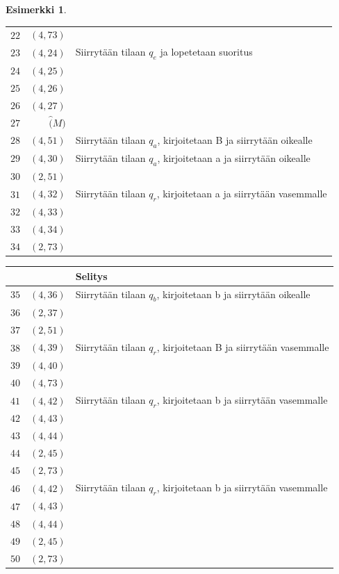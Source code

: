 \documentclass[a4paper, 12pt]{article}
\theoremstyle{definition}
\newtheorem{example}[mydef]{Esimerkki}
\theoremstyle{plain}
\begin{document}
\begin{example}
\begin{tabular}[t]{r|r|l}
$\hat{22}$ & $(4, 73)$  &\\
$\hat{23}$ & $(4, 24)$  & Siirrytään tilaan $q_e$ ja lopetetaan suoritus\\
$\hat{24}$ & $(4, 25)$  &\\
$\hat{25}$ & $(4, 26)$  &\\
$\hat{26}$ & $(4, 27)$  &\\
$\hat{27}$ & $\hat(M)$  &\\
$\hat{28}$ & $(4, 51)$  & Siirrytään tilaan $q_a$, kirjoitetaan B ja siirrytään oikealle\\
$\hat{29}$ & $(4, 30)$  & Siirrytään tilaan $q_a$, kirjoitetaan a ja siirrytään oikealle\\
$\hat{30}$ & $(2, 51)$  & \\
$\hat{31}$ & $(4, 32)$  & Siirrytään tilaan $q_r$, kirjoitetaan a ja siirrytään vasemmalle\\
$\hat{32}$ & $(4, 33)$\\
$\hat{33}$ & $(4, 34)$\\
$\hat{34}$ & $(2, 73)$  & \\
\end{tabular}
\begin{tabular}[t]{r|r|l}
& & Selitys\\
\hline
$\hat{35}$ & $(4, 36)$  & Siirrytään tilaan $q_b$, kirjoitetaan b ja siirrytään oikealle\\
$\hat{36}$ & $(2, 37)$  & \\
$\hat{37}$ & $(2, 51)$  & \\
$\hat{38}$ & $(4, 39)$  & Siirrytään tilaan $q_r$, kirjoitetaan B ja siirrytään vasemmalle\\
$\hat{39}$ & $(4, 40)$  & \\
$\hat{40}$ & $(4, 73)$  & \\
$\hat{41}$ & $(4, 42)$  & Siirrytään tilaan $q_r$, kirjoitetaan b ja siirrytään vasemmalle\\
$\hat{42}$ & $(4, 43)$\\
$\hat{43}$ & $(4, 44)$\\
$\hat{44}$ & $(2, 45)$  & \\
$\hat{45}$ & $(2, 73)$  & \\
$\hat{46}$ & $(4, 42)$  & Siirrytään tilaan $q_r$, kirjoitetaan b ja siirrytään vasemmalle\\
$\hat{47}$ & $(4, 43)$\\
$\hat{48}$ & $(4, 44)$\\
$\hat{49}$ & $(2, 45)$  & \\
$\hat{50}$ & $(2, 73)$  & \\

\end{tabular}
\end{example}
\end{document}
